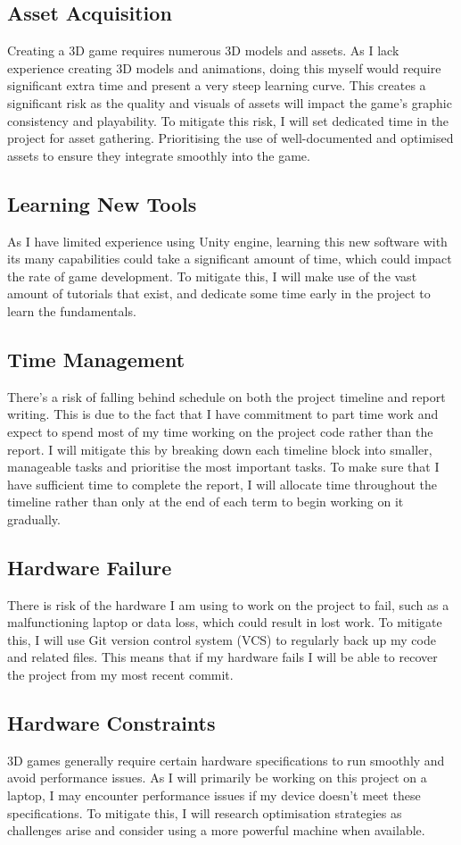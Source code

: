 \documentclass[12pt]{article}
\begin{document}
\subsection{Asset Acquisition}
Creating a 3D game requires numerous 3D models and assets. As I lack experience creating 3D models and animations, doing this myself would require significant extra time and present a very steep learning curve. This creates a significant risk as the quality and visuals of assets will impact the game’s graphic consistency and playability. To mitigate this risk, I will set dedicated time in the project for asset gathering. Prioritising the use of well-documented and optimised assets to ensure they integrate smoothly into the game.
\subsection{Learning New Tools}
As I have limited experience using Unity engine, learning this new software with its many capabilities could take a significant amount of time, which could impact the rate of game development. To mitigate this, I will make use of the vast amount of tutorials that exist, and dedicate some time early in the project to learn the fundamentals.
\subsection{Time Management}
There's a risk of falling behind schedule on both the project timeline and report writing. This is due to the fact that I have commitment to part time work and expect to spend most of my time working on the project code rather than the report. I will mitigate this by breaking down each timeline block into smaller, manageable tasks and prioritise the most important tasks. To make sure that I have sufficient time to complete the report, I will allocate time throughout the timeline rather than only at the end of each term to begin working on it gradually.
\subsection{Hardware Failure}
There is risk of the hardware I am using to work on the project to fail, such as a malfunctioning laptop or data loss, which could result in lost work.  To mitigate this, I will use Git version control system (VCS) to regularly back up my code and related files. This means that if my hardware fails I will be able to recover the project from my most recent commit.
\subsection{Hardware Constraints}
3D games generally require certain hardware specifications to run smoothly and avoid performance issues. As I will primarily be working on this project on a laptop, I may encounter performance issues if my device doesn't meet these specifications. To mitigate this, I will research optimisation strategies as challenges arise and consider using a more powerful machine when available. 
\end{document}

